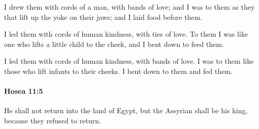 			\begin{versebox}
					\item[BHS] 
					\item[LXX] 
					\item[ASV] I drew them with cords of a man, with bands of love; and I was to them as they that lift up the yoke on their jaws; and I laid food before them.
					\item[NIV] I led them with cords of human kindness, with ties of love. To them I was like one who lifts a little child to the cheek, and I bent down to feed them.
					\item[NRSV] I led them with cords of human kindness, with bands of love. I was to them like those who lift infants to their cheeks. I bent down to them and fed them.
			\end{versebox}

		\paragraph{Hosea 11:5} %
			\label{HOSEA-11-5}

			He shall not return into the land of Egypt, but the Assyrian shall be his king, because they refused to return.

